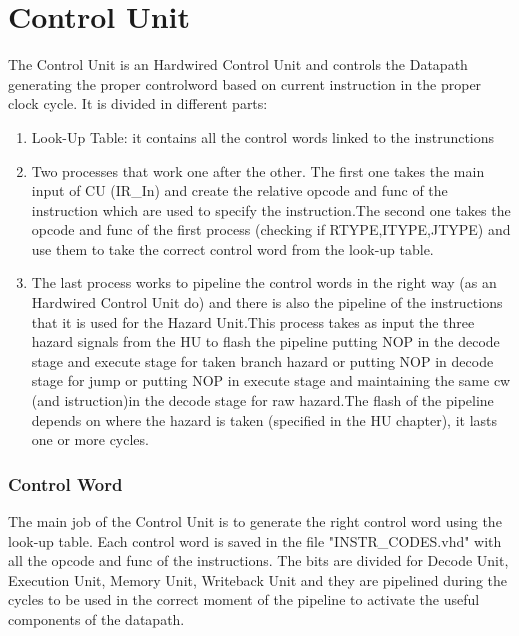 \chapter{Control Unit}
\label{Control Unit}
The Control Unit is an Hardwired Control Unit and controls the Datapath generating the proper controlword based on current instruction in the proper clock cycle. It is divided in different parts:
\begin{enumerate} 
    \item Look-Up Table: it contains all the control words linked to the instrunctions
    \item Two processes that work one after the other. The first one takes the main input of CU (IR\_In) and create the relative opcode and func of the instruction which are used to specify the instruction.The second one takes the opcode and func of the first process (checking if RTYPE,ITYPE,JTYPE) and use them to take the correct control word from the look-up table.
    \item The last process works to pipeline the control words in the right way (as an Hardwired Control Unit do) and there is also the pipeline of the instructions that it is used for the Hazard Unit.This process takes as input the three hazard signals from the HU to flash the pipeline putting NOP in the decode stage and execute stage for taken branch hazard or putting NOP in decode stage for jump or putting NOP in execute stage and maintaining the same cw (and istruction)in the decode stage for raw hazard.The flash of the pipeline depends on where the hazard is taken (specified in the HU chapter), it lasts one or more cycles. 
\end{enumerate}
\subsection{Control Word}
The main job of the Control Unit is to generate the right control word using the look-up table. Each control word is saved in the file "INSTR\_CODES.vhd" with all the opcode and func of the instructions.
The bits are divided for Decode Unit, Execution Unit, Memory Unit, Writeback Unit and they are pipelined during the cycles to be used in the correct moment of the pipeline to activate the useful components of the datapath.